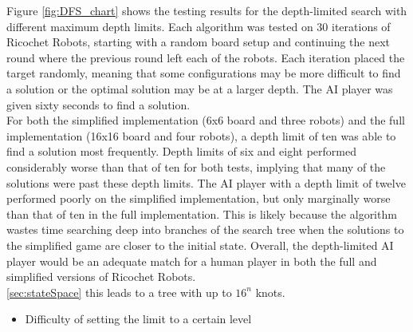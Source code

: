 \documentclass[a4paper,10pt]{article}
\begin{document}
  Figure \ref{fig:DFS_chart} shows the testing results for the depth-limited search with different maximum depth limits.  Each algorithm was tested on 30 iterations
  of Ricochet Robots, starting with a random board setup and continuing the next round where the previous round left each of the robots.  Each iteration placed the
  target randomly, meaning that some configurations may be more difficult to find a solution or the optimal solution may be at a larger depth.  The AI player was
  given sixty seconds to find a solution. \\

  For both the simplified implementation (6x6 board and three robots) and the full implementation (16x16 board and four robots), a depth limit of ten was able to
  find a solution most frequently.  Depth limits of six and eight performed considerably worse than that of ten for both tests, implying that many of the solutions were
  past these depth limits.  The AI player with a depth limit of twelve performed poorly on the simplified implementation, but only marginally worse than that of ten in
  the full implementation.  This is likely because the algorithm wastes time searching deep into branches of the search tree when the solutions to the simplified game
  are closer to the initial state.  Overall, the depth-limited AI player would be an adequate match for a human player in both the full and simplified versions of
  Ricochet Robots.\\

  
   \ref{sec:stateSpace} this leads to a tree with up to $16^n$ knots.
  \begin{itemize}
  	\item Difficulty of setting the limit to a certain level
  \end{itemize}
\end{document}
